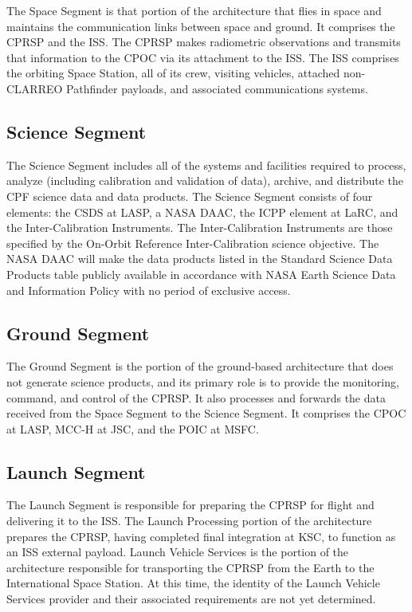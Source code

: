\documentclass[12pt,oneside,oldfontcommands]{memoir}
\begin{document}
The Space Segment is that portion of the architecture that flies in space and maintains the communication links between space and ground. It comprises the \gls{CPRSP} and the \gls{ISS}. The \gls{CPRSP} makes radiometric observations and transmits that information to the \gls{CPOC} via its attachment to the \gls{ISS}. The \gls{ISS} comprises the orbiting Space Station, all of its crew, visiting vehicles, attached non-\gls{CLARREO} Pathfinder payloads, and associated communications systems.

\subsection{Science Segment }
\label{sciencesegment}

The Science Segment includes all of the systems and facilities required to process, analyze (including calibration and validation of data), archive, and distribute the \gls{CPF} science data and data products. The Science Segment consists of four elements: the \gls{CSDS} at \gls{LASP}, a NASA \gls{DAAC}, the \gls{ICPP} element at \gls{LaRC}, and the Inter-Calibration Instruments. The Inter-Calibration Instruments are those specified by the On-Orbit Reference Inter-Calibration science objective. The NASA \gls{DAAC} will make the data products listed in the Standard Science Data Products table publicly available in accordance with NASA Earth Science Data and Information Policy with no period of exclusive access.

\subsection{Ground Segment }
\label{groundsegment}

The Ground Segment is the portion of the ground-based architecture that does not generate science products, and its primary role is to provide the monitoring, command, and control of the \gls{CPRSP}. It also processes and forwards the data received from the Space Segment to the Science Segment. It comprises the \gls{CPOC} at \gls{LASP}, \gls{MCC-H} at \gls{JSC}, and the \gls{POIC} at \gls{MSFC}.

\subsection{Launch Segment }
\label{launchsegment}

The Launch Segment is responsible for preparing the \gls{CPRSP} for flight and delivering it to the \gls{ISS}. The Launch Processing portion of the architecture prepares the \gls{CPRSP}, having completed final integration at \gls{KSC}, to function as an \gls{ISS} external payload. Launch Vehicle Services is the portion of the architecture responsible for transporting the \gls{CPRSP} from the Earth to the International Space Station. At this time, the identity of the Launch Vehicle Services provider and their associated requirements are not yet determined.
\end{document}
